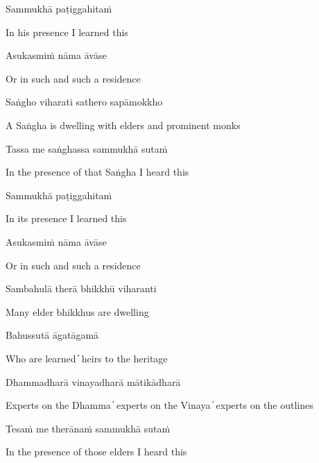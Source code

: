 Sammukhā paṭiggahitaṁ

\begin{cprenglish}
  In his presence I learned this
\end{cprenglish}

Asukasmiṁ nāma āvāse

\begin{cprenglish}
  Or in such and such a residence
\end{cprenglish}

Saṅgho viharati sathero sapāmokkho

\begin{cprenglish}
  A Saṅgha is dwelling with elders and prominent monks
\end{cprenglish}

Tassa me saṅghassa sammukhā sutaṁ

\begin{cprenglish}
  In the presence of that Saṅgha I heard this
\end{cprenglish}

Sammukhā paṭiggahitaṁ

\begin{cprenglish}
  In its presence I learned this
\end{cprenglish}

Asukasmiṁ nāma āvāse

\begin{cprenglish}
  Or in such and such a residence
\end{cprenglish}

Sambahulā therā bhikkhū viharanti

\begin{cprenglish}
  Many elder bhikkhus are dwelling
\end{cprenglish}

Bahussutā āgatāgamā

\begin{cprenglish}
  Who are learned  ̓  heirs to the heritage
\end{cprenglish}

Dhammadharā vinayadharā mātikādharā

\begin{cprenglish}
  Experts on the Dhamma  ̓  experts on the Vinaya  ̓  experts on the outlines
\end{cprenglish}

Tesaṁ me therānaṁ sammukhā sutaṁ

\begin{cprenglish}
  In the presence of those elders I heard this
\end{cprenglish}

